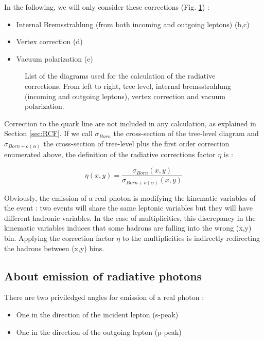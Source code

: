 In the following, we will only consider these corrections (Fig. \ref{fig:rad_dia}) :
\begin{itemize}
\item Internal Bremsstrahlung (from both incoming and outgoing leptons) (b,c)
\item Vertex correction (d)
\item Vacuum polarization (e)
\end{itemize}

\begin{figure}[htb]
\centerline{}
\caption{List of the diagrams used for the calculation of the radiative corrections. From left to right, tree level, internal bremsstrahlung (incoming and outgoing leptons), vertex correction and vacuum polarization.}\label{fig:rad_dia}
\end{figure}

Correction to the quark line are not included in any calculation, as explained in Section \ref{sec:RCF}. If we call $\sigma_{Born}$ the cross-section of the tree-level diagram and $\sigma_{Born+o(\alpha)}$ the cross-section of tree-level plus the first order correction enumerated above, the definition of the radiative corrections factor $\eta$ is :

\begin{equation} \label{eq:RCF_def}
  \eta(x,y)=\frac{\sigma_{Born}(x,y)}{\sigma_{Born+o(\alpha)}(x,y)}
\end{equation}

Obviously, the emission of a real photon is modifying the kinematic variables of the event : two events will share the same leptonic variables but they will have different hadronic variables. In the case of multiplicities, this discrepancy in the kinematic variables induces that some hadrons are falling into the wrong (x,y) bin. Applying the correction factor $\eta$ to the multiplicities is indirectly redirecting the hadrons between (x,y) bins.

\subsection{About emission of radiative photons}

There are two priviledged angles for emission of a real photon :
\begin{itemize}
\item One in the direction of the incident lepton (s-peak)
\item One in the direction of the outgoing lepton (p-peak)
\end{itemize}


